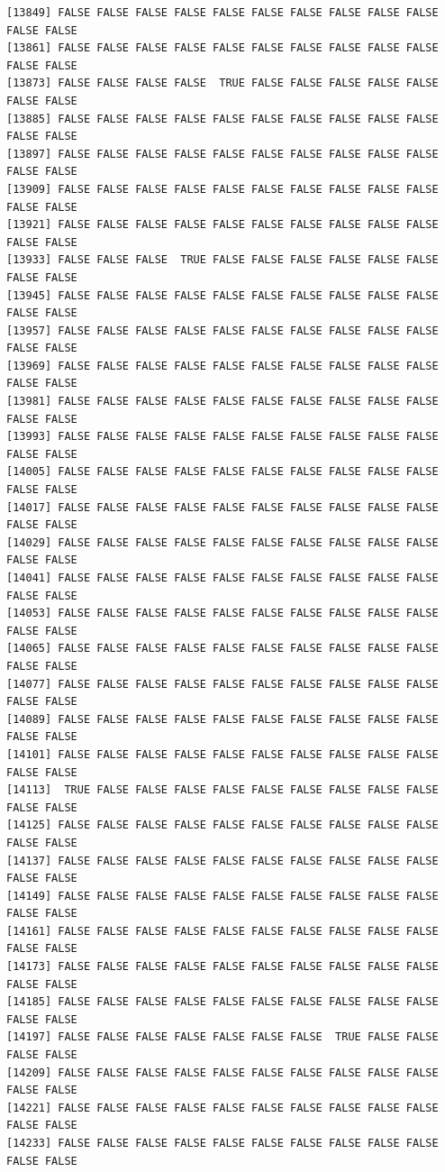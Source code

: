 \documentclass[
  a4paper,
  DIV=11,
  numbers=noendperiod]{scrartcl}
\begin{document}
\begin{verbatim}
[13849] FALSE FALSE FALSE FALSE FALSE FALSE FALSE FALSE FALSE FALSE FALSE FALSE
[13861] FALSE FALSE FALSE FALSE FALSE FALSE FALSE FALSE FALSE FALSE FALSE FALSE
[13873] FALSE FALSE FALSE FALSE  TRUE FALSE FALSE FALSE FALSE FALSE FALSE FALSE
[13885] FALSE FALSE FALSE FALSE FALSE FALSE FALSE FALSE FALSE FALSE FALSE FALSE
[13897] FALSE FALSE FALSE FALSE FALSE FALSE FALSE FALSE FALSE FALSE FALSE FALSE
[13909] FALSE FALSE FALSE FALSE FALSE FALSE FALSE FALSE FALSE FALSE FALSE FALSE
[13921] FALSE FALSE FALSE FALSE FALSE FALSE FALSE FALSE FALSE FALSE FALSE FALSE
[13933] FALSE FALSE FALSE  TRUE FALSE FALSE FALSE FALSE FALSE FALSE FALSE FALSE
[13945] FALSE FALSE FALSE FALSE FALSE FALSE FALSE FALSE FALSE FALSE FALSE FALSE
[13957] FALSE FALSE FALSE FALSE FALSE FALSE FALSE FALSE FALSE FALSE FALSE FALSE
[13969] FALSE FALSE FALSE FALSE FALSE FALSE FALSE FALSE FALSE FALSE FALSE FALSE
[13981] FALSE FALSE FALSE FALSE FALSE FALSE FALSE FALSE FALSE FALSE FALSE FALSE
[13993] FALSE FALSE FALSE FALSE FALSE FALSE FALSE FALSE FALSE FALSE FALSE FALSE
[14005] FALSE FALSE FALSE FALSE FALSE FALSE FALSE FALSE FALSE FALSE FALSE FALSE
[14017] FALSE FALSE FALSE FALSE FALSE FALSE FALSE FALSE FALSE FALSE FALSE FALSE
[14029] FALSE FALSE FALSE FALSE FALSE FALSE FALSE FALSE FALSE FALSE FALSE FALSE
[14041] FALSE FALSE FALSE FALSE FALSE FALSE FALSE FALSE FALSE FALSE FALSE FALSE
[14053] FALSE FALSE FALSE FALSE FALSE FALSE FALSE FALSE FALSE FALSE FALSE FALSE
[14065] FALSE FALSE FALSE FALSE FALSE FALSE FALSE FALSE FALSE FALSE FALSE FALSE
[14077] FALSE FALSE FALSE FALSE FALSE FALSE FALSE FALSE FALSE FALSE FALSE FALSE
[14089] FALSE FALSE FALSE FALSE FALSE FALSE FALSE FALSE FALSE FALSE FALSE FALSE
[14101] FALSE FALSE FALSE FALSE FALSE FALSE FALSE FALSE FALSE FALSE FALSE FALSE
[14113]  TRUE FALSE FALSE FALSE FALSE FALSE FALSE FALSE FALSE FALSE FALSE FALSE
[14125] FALSE FALSE FALSE FALSE FALSE FALSE FALSE FALSE FALSE FALSE FALSE FALSE
[14137] FALSE FALSE FALSE FALSE FALSE FALSE FALSE FALSE FALSE FALSE FALSE FALSE
[14149] FALSE FALSE FALSE FALSE FALSE FALSE FALSE FALSE FALSE FALSE FALSE FALSE
[14161] FALSE FALSE FALSE FALSE FALSE FALSE FALSE FALSE FALSE FALSE FALSE FALSE
[14173] FALSE FALSE FALSE FALSE FALSE FALSE FALSE FALSE FALSE FALSE FALSE FALSE
[14185] FALSE FALSE FALSE FALSE FALSE FALSE FALSE FALSE FALSE FALSE FALSE FALSE
[14197] FALSE FALSE FALSE FALSE FALSE FALSE FALSE  TRUE FALSE FALSE FALSE FALSE
[14209] FALSE FALSE FALSE FALSE FALSE FALSE FALSE FALSE FALSE FALSE FALSE FALSE
[14221] FALSE FALSE FALSE FALSE FALSE FALSE FALSE FALSE FALSE FALSE FALSE FALSE
[14233] FALSE FALSE FALSE FALSE FALSE FALSE FALSE FALSE FALSE FALSE FALSE FALSE

\end{verbatim}
\end{document}
